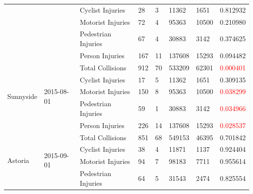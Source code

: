 \documentclass[10pt,journal,compsoc]{IEEEtran}
\begin{document}
\begin{table}[]
\begin{tabular}{|l|l|l|l|l|l|l|l|}
                                            &                             & Cyclist Injuries    & 28        & 3        & 11362      & 1651      & 0.812932 \\ \cline{3-8} 
                                            &                             & Motorist Injuries   & 72        & 4        & 95363      & 10500     & 0.210980 \\ \cline{3-8} 
                                            &                             & Pedestrian Injuries & 67        & 4        & 30883      & 3142      & 0.374625 \\ \cline{3-8} 
                                            &                             & Person Injuries     & 167       & 11       & 137608     & 15293     & 0.094482 \\ \hline
\multirow{5}{*}{Sunnyside}                  & \multirow{5}{*}{2015-08-01} & Total Collisions    & 912       & 70       & 533209     & 62301     & \textcolor{red}{0.000401} \\ \cline{3-8} 
                                            &                             & Cyclist Injuries    & 17        & 5        & 11362      & 1651      & 0.309135 \\ \cline{3-8} 
                                            &                             & Motorist Injuries   & 150       & 8        & 95363      & 10500     & \textcolor{red}{0.038299} \\ \cline{3-8} 
                                            &                             & Pedestrian Injuries & 59        & 1        & 30883      & 3142      & \textcolor{red}{0.034966} \\ \cline{3-8} 
                                            &                             & Person Injuries     & 226       & 14       & 137608     & 15293     & \textcolor{red}{0.028537} \\ \hline
\multirow{5}{*}{Astoria}                    & \multirow{5}{*}{2015-09-01} & Total Collisions    & 851       & 68       & 549153     & 46395     & 0.701842 \\ \cline{3-8} 
                                            &                             & Cyclist Injuries    & 38        & 4        & 11871      & 1137      & 0.924404 \\ \cline{3-8} 
                                            &                             & Motorist Injuries   & 94        & 7        & 98183      & 7711      & 0.955614 \\ \cline{3-8} 
                                            &                             & Pedestrian Injuries & 64        & 5        & 31543      & 2474      & 0.825554 \\ \cline{3-8} 

\end{tabular}
\end{table}
\end{document}
